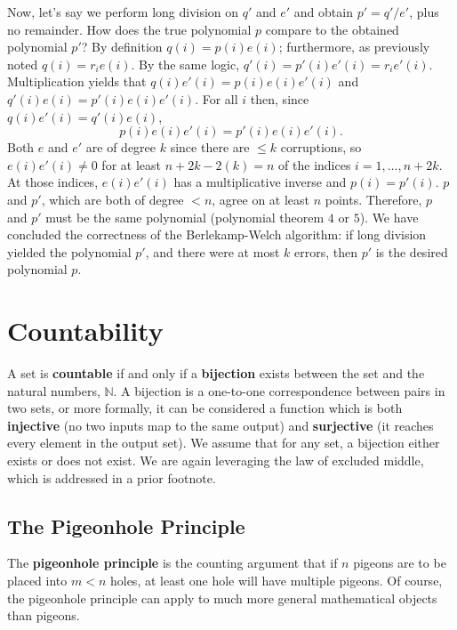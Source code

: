 \documentclass[12pt]{article}
\begin{document}
\begin{enumerate}
\begin{enumerate}
Now, let's say we perform long division on $q'$ and $e'$ and obtain $p' = q'/e'$, plus no remainder. How does the true polynomial $p$ compare to the obtained polynomial $p'$? By definition $q(i) = p(i) e(i)$; furthermore, as previously noted $q(i) = r_i e(i)$. By the same logic, $q'(i) = p'(i) e'(i) = r_i e'(i)$. Multiplication yields that $q(i) e'(i) = p(i) e(i) e'(i)$ and $q'(i) e(i) = p'(i) e(i) e'(i)$. For all $i$ then, since $q(i)e'(i) = q'(i)e(i)$,
\[ p(i) e(i) e'(i) = p'(i) e(i) e'(i). \]
Both $e$ and $e'$ are of degree $k$ since there are $\leq k$ corruptions, so $e(i) e'(i) \neq 0$ for at least $n + 2k - 2(k) = n$ of the indices $i = 1, \ldots, n + 2k$. At those indices, $e(i) e'(i)$ has a multiplicative inverse and $p(i) = p'(i)$. $p$ and $p'$, which are both of degree $< n$, agree on at least $n$ points. Therefore, $p$ and $p'$ must be the same polynomial (polynomial theorem $4$ or $5$). We have concluded the correctness of the Berlekamp-Welch algorithm: if long division yielded the polynomial $p'$, and there were at most $k$ errors, then $p'$ is the desired polynomial $p$.
\end{enumerate}
\end{enumerate}

\section{Countability}

A set is \textbf{countable} if and only if a \textbf{bijection} exists between the set and the natural numbers, $\mathbb N$. A bijection is a one-to-one correspondence between pairs in two sets, or more formally, it can be considered a function which is both \textbf{injective} (no two inputs map to the same output) and \textbf{surjective} (it reaches every element in the output set). We assume that for any set, a bijection either exists or does not exist. We are again leveraging the law of excluded middle, which is addressed in a prior footnote.

\subsection{The Pigeonhole Principle}

The \textbf{pigeonhole principle} is the counting argument that if $n$ pigeons are to be placed into $m < n$ holes, at least one hole will have multiple pigeons. Of course, the pigeonhole principle can apply to much more general mathematical objects than pigeons.
\end{document}
